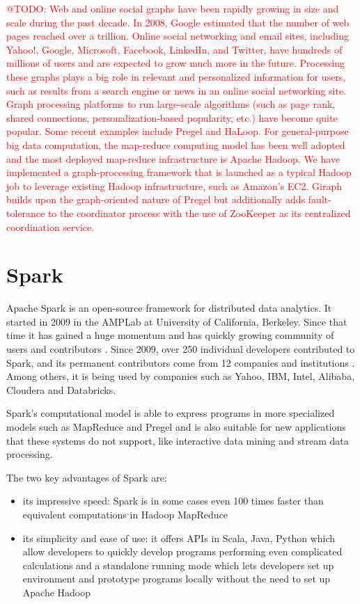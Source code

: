 \documentclass{pracamgr}
\makeatletter
\theoremstyle{plain}
\theoremstyle{definition}
\theoremstyle{remark}
\newcommand{\todo}[1]{\textcolor{red}{@TODO: #1}}
\makeatother
\begin{document}
\todo{
Web and online social graphs have been rapidly growing in size and scale during the past decade. In 2008, Google estimated that the number of web pages reached over a trillion. Online social networking and email sites, including Yahoo!, Google, Microsoft, Facebook, LinkedIn, and Twitter, have hundreds of millions of users and are expected to grow much more in the future. Processing these graphs plays a big role in relevant and personalized information for users, such as results from a search engine or news in an online social networking site.
Graph processing platforms to run large-scale algorithms (such as page rank, shared connections, personalization-based popularity, etc.) have become quite popular. Some recent examples include Pregel and HaLoop. For general-purpose big data computation, the map-reduce computing model has been well adopted and the most deployed map-reduce infrastructure is Apache Hadoop. We have implemented a graph-processing framework that is launched as a typical Hadoop job to leverage existing Hadoop infrastructure, such as Amazon's EC2. Giraph builds upon the graph-oriented nature of Pregel but additionally adds fault-tolerance to the coordinator process with the use of ZooKeeper as its centralized coordination service.}

\section{Spark}
Apache Spark \cite{spark, spark2} is an open-source framework for distributed data analytics. It started in 2009 in the AMPLab at University of California, Berkeley. Since that time it has gained a huge momentum and has quickly growing community of users and contributors \cite{sparkgrowingcommunity}. Since 2009, over 250 individual developers contributed to Spark, and its permanent contributors come from 12 companies and institutions \cite{sparkwww}. Among others, it is being used by companies such as Yahoo, IBM, Intel, Alibaba, Cloudera and Databricks.

Spark's computational model is able to express programs in more specialized models such as MapReduce and Pregel and is also suitable for new applications that these systems do not support, like interactive data mining and stream data processing.

The two key advantages of Spark are:
\begin{itemize}
\item its impressive speed: Spark is in some cases even 100 times faster than equivalent computations in Hadoop MapReduce
\item its simplicity and ease of use: it offers  APIs in Scala, Java, Python which allow developers to quickly develop programs performing even complicated calculations and a standalone running mode which lets developers set up environment and prototype programs locally without the need to set up Apache Hadoop 
\end{itemize}
\end{document}
